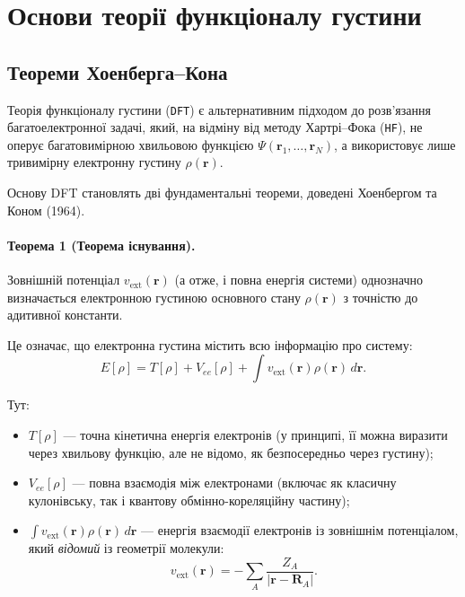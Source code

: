 
\section{Основи теорії функціоналу густини}

\subsection{Теореми Хоенберга--Кона}

Теорія функціоналу густини (\texttt{DFT}) є альтернативним підходом до розв'язання багатоелектронної задачі, який, на відміну від методу Хартрі--Фока (\texttt{HF}), не оперує багатовимірною хвильовою функцією $\Psi(\mathbf{r}_1,\dots,\mathbf{r}_N)$, а використовує лише тривимірну електронну густину $\rho(\mathbf{r})$.

\medskip
Основу DFT становлять дві фундаментальні теореми, доведені Хоенбергом та Коном (1964).

\paragraph{Теорема 1 (Теорема існування).}
Зовнішній потенціал $v_{\text{ext}}(\mathbf{r})$ (а отже, і повна енергія системи) однозначно визначається електронною густиною основного стану $\rho(\mathbf{r})$ з точністю до адитивної константи.

Це означає, що електронна густина містить всю інформацію про систему:
\begin{equation}
	E[\rho] = T[\rho] + V_{ee}[\rho] + \int v_{\text{ext}}(\mathbf{r}) \rho(\mathbf{r})\, d\mathbf{r}.
\end{equation}

\noindent
Тут:
\begin{itemize}
	\item $T[\rho]$ --- точна кінетична енергія електронів (у принципі, її можна виразити через хвильову функцію, але не відомо, як безпосередньо через густину);
	\item $V_{ee}[\rho]$ --- повна взаємодія між електронами (включає як класичну кулонівську, так і квантову обмінно-кореляційну частину);
	\item $\displaystyle \int v_{\text{ext}}(\mathbf{r}) \rho(\mathbf{r})\, d\mathbf{r}$ --- енергія взаємодії електронів із зовнішнім потенціалом, який \emph{відомий} із геометрії молекули:
	      \begin{equation*}
		      v_{\text{ext}}(\mathbf{r}) = -\sum_A \frac{Z_A}{|\mathbf{r}-\mathbf{R}_A|}.
	      \end{equation*}
\end{itemize}

